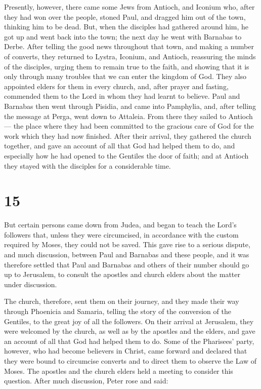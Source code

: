  Presently, however, there came some Jews from Antioch, and
Iconium who, after they had won over the people, stoned Paul, and
dragged him out of the town, thinking him to be dead.  But,
when the disciples had gathered around him, he got up and went back into
the town; the next day he went with Barnabas to Derbe. 
After telling the good news throughout that town, and making a number of
converts, they returned to Lystra, Iconium, and Antioch, 
reassuring the minds of the disciples, urging them to remain true to the
faith, and showing that it is only through many troubles that we can
enter the kingdom of God.  They also appointed elders for
them in every church, and, after prayer and fasting, commended them to
the Lord in whom they had learnt to believe.  Paul and
Barnabas then went through Pisidia, and came into Pamphylia,
 and, after telling the message at Perga, went down to
Attaleia.  From there they sailed to Antioch --- the place
where they had been committed to the gracious care of God for the work
which they had now finished.  After their arrival, they
gathered the church together, and gave an account of all that God had
helped them to do, and especially how he had opened to the Gentiles the
door of faith;  and at Antioch they stayed with the
disciples for a considerable time.

\hypertarget{section-14}{%
\section{15}\label{section-14}}

 But certain persons came down from Judea, and began to
teach the Lord's followers that, unless they were circumcised, in
accordance with the custom required by Moses, they could not be saved.
 This gave rise to a serious dispute, and much discussion,
between Paul and Barnabas and these people, and it was therefore settled
that Paul and Barnabas and others of their number should go up to
Jerusalem, to consult the apostles and church elders about the matter
under discussion.

 The church, therefore, sent them on their journey, and they
made their way through Phoenicia and Samaria, telling the story of the
conversion of the Gentiles, to the great joy of all the followers.
 On their arrival at Jerusalem, they were welcomed by the
church, as well as by the apostles and the elders, and gave an account
of all that God had helped them to do.  Some of the
Pharisees' party, however, who had become believers in Christ, came
forward and declared that they were bound to circumcise converts and to
direct them to observe the Law of Moses.  The apostles and
the church elders held a meeting to consider this question. 
After much discussion, Peter rose and said:

